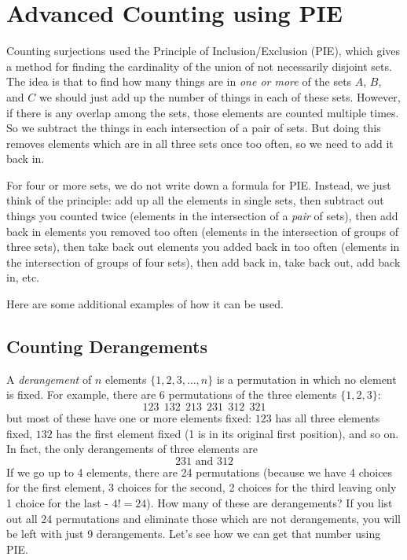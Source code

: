 \documentclass[12pt]{article}
\begin{document}
\section{Advanced Counting using PIE}

Counting surjections used the Principle of Inclusion/Exclusion (PIE), which gives a method for finding the cardinality of the union of not necessarily disjoint sets. The idea is that to find how many things are in {\em one or more} of the sets $A$, $B$, and $C$ we should just add up the number of things in each of these sets.  However, if there is any overlap among the sets, those elements are counted multiple times.  So we subtract the things in each intersection of a pair of sets.  But doing this removes elements which are in all three sets once too often, so we need to add it back in.

For four or more sets, we do not write down a formula for PIE.  Instead, we just think of the principle: add up all the elements in single sets, then subtract out things you counted twice (elements in the intersection of a {\em pair} of sets), then add back in elements you removed too often (elements in the intersection of groups of three sets), then take back out elements you added back in too often (elements in the intersection of groups of four sets), then add back in, take back out, add back in, etc.  

Here are some additional examples of how it can be used.

\subsection{Counting Derangements}

A {\em derangement} of $n$ elements $\{1,2,3,\ldots, n\}$ is a permutation in which no element is fixed.  For example, there are $6$ permutations of the three elements $\{1,2,3\}$:
\[123 ~~ 132 ~~ 213 ~~ 231 ~~ 312 ~~ 321\]
but most of these have one or more elements fixed: $123$ has all three elements fixed, $132$ has the first element fixed (1 is in its original first position), and so on.  In fact, the only derangements of three elements are
\[231 \mbox{  and  }312\]
If we go up to 4 elements, there are 24 permutations (because we have 4 choices for the first element, 3 choices for the second, 2 choices for the third leaving only 1 choice for the last - $4! = 24$).  How many of these are derangements?  If you list out all 24 permutations and eliminate those which are not derangements, you will be left with just 9 derangements.  Let's see how we can get that number using PIE.
\end{document}
